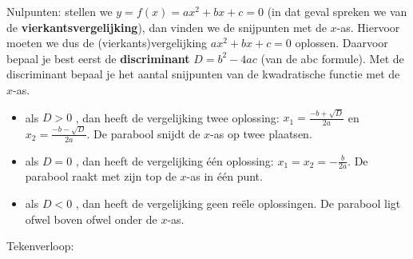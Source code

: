 Nulpunten: stellen we $y=f(x)=ax^{2}+bx+c=0$
(in dat geval spreken we van de \textbf{vierkantsvergelijking}), dan
vinden we de snijpunten met de $x$-as. Hiervoor moeten we dus de
(vierkants)vergelijking $ax^{2}+bx+c=0$ oplossen. Daarvoor bepaal
je best eerst de \textbf{discriminant} $D=b^{2}-4ac$ (van de abc
formule). Met de discriminant bepaal je het aantal snijpunten van
de kwadratische functie met de $x$-as.
\begin{itemize}
\item als $D>0$ , dan heeft de vergelijking twee oplossing: $x_{1}=\frac{-b+\sqrt{D}}{2a}$
en $x_{2}=\frac{-b-\sqrt{D}}{2a}$. De parabool snijdt de $x$-as
op twee plaatsen.
\item als $D=0$ , dan heeft de vergelijking \'e\'en oplossing: $x_{1}=x_{2}=-\frac{b}{2a}$.
De parabool raakt met zijn top de $x$-as in \'e\'en punt.
\item als $D<0$ , dan heeft de vergelijking geen re\"ele oplossingen. De
parabool ligt ofwel boven ofwel onder de $x$-as.
\end{itemize}





Tekenverloop:

